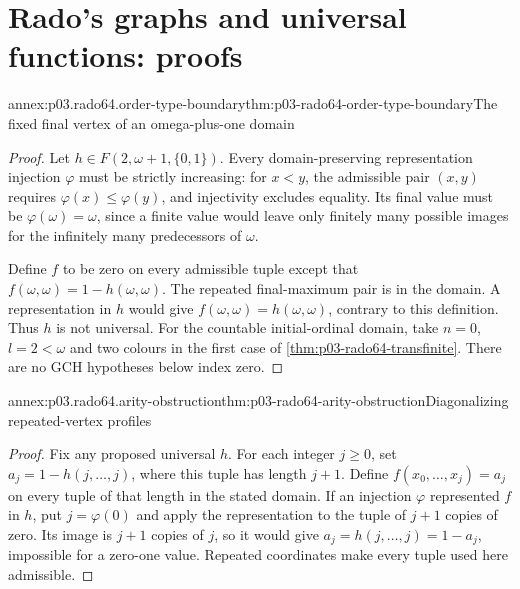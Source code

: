 \section{Rado's graphs and universal functions: proofs}
\label{sec:annex-p03-rado-1964}

\begin{annexitem}{annex:p03.rado64.order-type-boundary}{thm:p03-rado64-order-type-boundary}{The fixed final vertex of an omega-plus-one domain}
\begin{proof}
Let \(h\in F(2,\omega+1,\{0,1\})\). Every domain-preserving
representation injection \(\varphi\) must be strictly increasing:
for \(x<y\), the admissible pair \((x,y)\) requires
\(\varphi(x)\leq\varphi(y)\), and injectivity excludes equality.
Its final value must be \(\varphi(\omega)=\omega\), since a finite
value would leave only finitely many possible images for the infinitely
many predecessors of \(\omega\).

Define \(f\) to be zero on every admissible tuple except that
\(f(\omega,\omega)=1-h(\omega,\omega)\).
The repeated final-maximum pair is in the domain. A representation in
\(h\) would give \(f(\omega,\omega)=h(\omega,\omega)\), contrary
to this definition. Thus \(h\) is not universal. For the countable
initial-ordinal domain, take \(n=0\), \(l=2<\omega\) and two
colours in the first case of \cref{thm:p03-rado64-transfinite}.
There are no GCH hypotheses below index zero.
\end{proof}
\end{annexitem}

\begin{annexitem}{annex:p03.rado64.arity-obstruction}{thm:p03-rado64-arity-obstruction}{Diagonalizing repeated-vertex profiles}
\begin{proof}
Fix any proposed universal \(h\). For each integer \(j\geq0\), set
\(a_j=1-h(j,\ldots,j)\), where this tuple has length \(j+1\).
Define \(f(x_0,\ldots,x_j)=a_j\) on every tuple of that length in the
stated domain. If an injection \(\varphi\) represented \(f\) in \(h\),
put \(j=\varphi(0)\) and apply the representation to the tuple of
\(j+1\) copies of zero. Its image is \(j+1\) copies of \(j\), so it would
give \(a_j=h(j,\ldots,j)=1-a_j\), impossible for a zero-one value.
Repeated coordinates make every tuple used here admissible.
\end{proof}
\end{annexitem}

